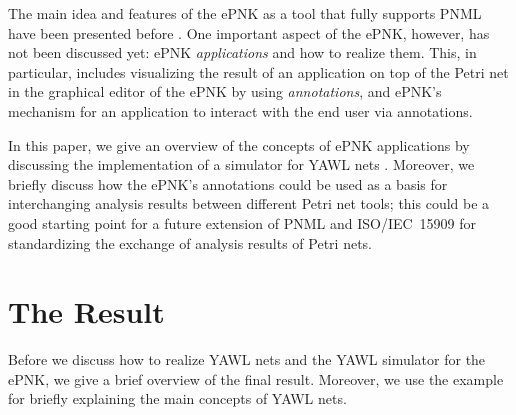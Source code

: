 \documentclass[a4paper]{llncs}
\begin{document}
The main idea and features of the ePNK as a tool that fully supports
PNML have been presented before \cite{Kin11d,Kin12c}.
One important aspect of the ePNK, however, has not been discussed yet:
ePNK \emph{applications} and how to realize them. This, in particular,
includes visualizing the result of an application on top of the
Petri net in the graphical editor of the ePNK by using \emph{annotations},
and ePNK's mechanism for an application to interact with the end user
via annotations.

In this paper, we give an overview of the concepts of ePNK applications by discussing
the implementation of a simulator for YAWL nets \cite{vAtH05}. Moreover, we briefly discuss
how the ePNK's annotations could be used as a basis for interchanging analysis results
between different Petri net tools; this could be a good starting point for a
future extension of PNML and ISO/IEC~15909 \cite{HKea09,ISO-IEC:15909-2-2011} for
standardizing the exchange of analysis results of Petri nets.

\section{The Result}
\label{sec:simulator}

Before we discuss how to realize YAWL nets and the YAWL simulator for the ePNK,
we give a brief overview of the final result. Moreover, we use the example for
briefly explaining the main concepts of YAWL nets.
\end{document}

